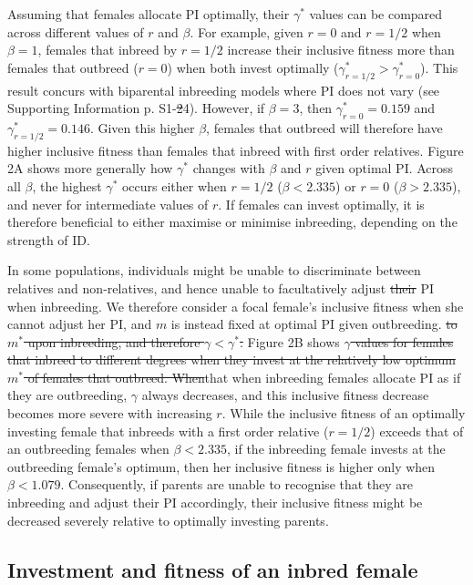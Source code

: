 \documentclass[12pt]{article}
\begin{document}
Assuming that females allocate PI optimally, their $\gamma^{*}$ values can be compared across different values of $r$ and $\beta$. For example, given $r=0$ and $r=1/2$ when $\beta=1$, females that inbreed by $r=1/2$ increase their inclusive fitness more than females that outbreed ($r=0$) when both invest optimally ($\gamma^{*}_{r=1/2}>\gamma^{*}_{r=0}$). This result concurs with biparental inbreeding models where PI does not vary (see Supporting Information p. S1-{\color{red}\st{2}}{\color{blue}4}). However, if $\beta=3$, then $\gamma^{*}_{r=0}=0.159$ and $\gamma^{*}_{r=1/2}=0.146$. Given this higher $\beta$, females that outbreed will therefore have higher inclusive fitness than females that inbreed with first order relatives. Figure 2A shows more generally how $\gamma^{*}$ changes with $\beta$ and $r$ given optimal PI. Across all $\beta$, the highest $\gamma^{*}$ occurs either when $r=1/2$ ($\beta < 2.335$) or $r=0$ ($\beta > 2.335$), and never for intermediate values of $r$. If females can invest optimally, it is therefore beneficial to either maximise or minimise inbreeding, depending on the strength of ID.

In some populations, individuals might be unable to discriminate between relatives and non-relatives, and hence unable to {\color{blue}facultatively} adjust {\color{red}\st{their}} PI when inbreeding. We therefore consider a focal female's inclusive fitness when she cannot adjust her PI{\color{blue}, and $m$ is instead fixed at optimal PI given outbreeding.} {\color{red}\st{to $m^{*}$ upon inbreeding, and therefore $\gamma < \gamma^{*}$.}} Figure 2B shows {\color{red}\st{$\gamma$ values for females that inbreed to different degrees when they invest at the relatively low optimum $m^{*}$ of females that outbreed. When}}{\color{blue}that when} inbreeding females allocate PI as if they are outbreeding, $\gamma$ always decreases, and this inclusive fitness decrease becomes more severe with increasing $r$. While the inclusive fitness of an optimally investing female that inbreeds with a first order relative ($r=1/2$) exceeds that of an outbreeding females when $\beta < 2.335$, if the inbreeding female invests at the outbreeding female's optimum, then her inclusive fitness is higher only when $\beta < 1.079$. Consequently, if parents are unable to recognise that they are inbreeding and adjust their PI accordingly, their inclusive fitness might be decreased severely relative to optimally investing parents.


\subsection*{Investment and fitness of an inbred female}
\end{document}
